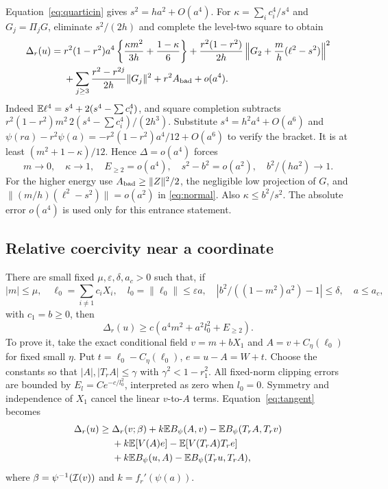 Equation~\eqref{eq:quarticin} gives $s^2=ha^2+O(a^4)$.
For $\kappa=\sum_i c_i^4/s^4$ and $G_j=\Pi_jG$, eliminate $s^2/(2h)$
and complete the level-two square to obtain
\begin{align}
 \Delta_r(u)={}&r^2(1-r^2)a^4
       \left\{\frac{\kappa m^2}{3h}+\frac{1-\kappa}{6}\right\}
   +\frac{r^2(1-r^2)}{2h}
       \left\|G_2+\frac m h(\ell^2-s^2)\right\|^2\notag\\
 &+\sum_{j\ge3}\frac{r^2-r^{2j}}{2h}\|G_j\|^2
       +r^2A_{\rm bad}+o(a^4).\label{eq:normal}
\end{align}
Indeed $\mathbb E\ell^4=s^4+2(s^4-\sum c_i^4)$, and square completion
subtracts $r^2(1-r^2)m^2\,2(s^4-\sum c_i^4)/(2h^3)$.
Substitute $s^4=h^2a^4+O(a^6)$ and
$\psi(ra)-r^2\psi(a)=-r^2(1-r^2)a^4/12+O(a^6)$ to verify the
bracket. It is at least $(m^2+1-\kappa)/12$.
Hence $\Delta=o(a^4)$ forces
\begin{equation}\label{eq:coneentrance}
 m\to0,\quad\kappa\to1,\quad E_{\ge2}=o(a^4),\quad
 s^2-b^2=o(a^2),\quad b^2/(ha^2)\to1.
\end{equation}
For the higher energy use $A_{\rm bad}\ge\|Z\|^2/2$, the negligible
low projection of $G$, and
$\|(m/h)(\ell^2-s^2)\|=o(a^2)$ in \eqref{eq:normal}.
Also $\kappa\le b^2/s^2$. The absolute error $o(a^4)$ is used only
for this entrance statement.

\subsection{Relative coercivity near a coordinate}
There are small fixed $\mu,\varepsilon,\delta,a_c>0$ such that, if
\begin{equation}\label{eq:cone}
 |m|\le\mu,\quad \ell_0=\sum_{i\ne1}c_iX_i,\quad
 l_0=\|\ell_0\|\le\varepsilon a,\quad
 |b^2/((1-m^2)a^2)-1|\le\delta,\quad a\le a_c,
\end{equation}
with $c_1=b\ge0$, then
\begin{equation}\label{eq:relative}
 \Delta_r(u)\ge c(a^4m^2+a^2l_0^2+E_{\ge2}).
\end{equation}
To prove it, take the exact conditional field $v=m+bX_1$ and
$A=v+C_\eta(\ell_0)$ for fixed small $\eta$.
Put $t=\ell_0-C_\eta(\ell_0)$, $e=u-A=W+t$.
Choose the constants so that $|A|,|T_rA|\le\gamma$ with
$\gamma^2<1-r_1^2$.
All fixed-norm clipping errors are bounded by
$E_l=Ce^{-c/l_0^2}$, interpreted as zero when $l_0=0$.
Symmetry and independence of $X_1$ cancel the linear $v$-to-$A$ terms.
Equation~\eqref{eq:tangent} becomes
\begin{align}
 \Delta_r(u)\ge{}&\Delta_r(v;\beta)
 +k\mathbb E B_\psi(A,v)-\mathbb E B_\psi(T_rA,T_rv)\notag\\
 &+k\mathbb E[V(A)e]-\mathbb E[V(T_rA)T_re]\notag\\
 &+k\mathbb E B_\psi(u,A)-\mathbb E B_\psi(T_ru,T_rA),\label{eq:conedecomp}
\end{align}
where $\beta=\psi^{-1}(\mathcal I(v))$ and $k=f_r'(\psi(a))$.

